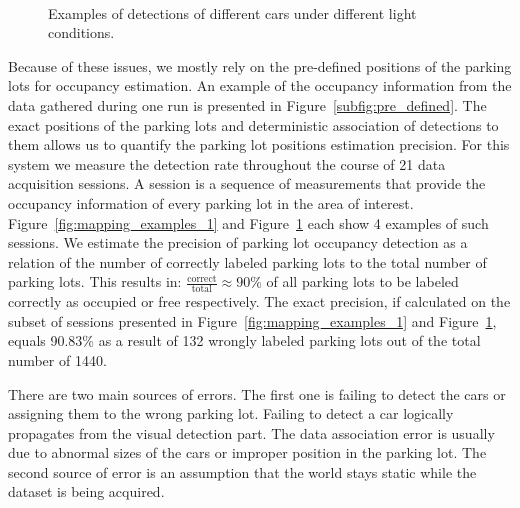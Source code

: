 \begin{figure}[p]
\hspace{2mm}
\\
\caption{Examples of detections of different cars under different light conditions.}
\label{fig:mapping_examples_2}
\end{figure}

Because of these issues, we mostly rely on the pre-defined positions of the
parking lots for occupancy estimation. An example of the occupancy information
from the data gathered during one run is presented in
Figure~\ref{subfig:pre_defined}. The exact positions of the parking lots and
deterministic association of detections to them allows us to quantify the
parking lot positions estimation precision. For this system we measure the
detection rate throughout the course of 21 data acquisition sessions. A
session is a sequence of measurements that provide the occupancy information
of every parking lot in the area of interest.
Figure~\ref{fig:mapping_examples_1} and Figure~\ref{fig:mapping_examples_2}
each show 4 examples of such sessions. We estimate the precision of parking
lot occupancy detection as a relation of the number of correctly labeled
parking lots to the total number of parking lots. This results in:
$\frac{\mathrm{correct}}{\mathrm{total}} \approx 90\% $ of all parking lots to
be labeled correctly as occupied or free respectively. The exact precision, if
calculated on the subset of sessions presented in
Figure~\ref{fig:mapping_examples_1} and Figure~\ref{fig:mapping_examples_2},
equals 90.83\% as a result of 132 wrongly labeled parking lots out of the
total number of 1440.

There are two main sources of errors. The first one is failing to detect the
cars or assigning them to the wrong parking lot. Failing to detect a car
logically propagates from the visual detection part. The data association
error is usually due to abnormal sizes of the cars or improper position in the
parking lot. The second source of error is an assumption that the world stays
static while the dataset is being acquired.

